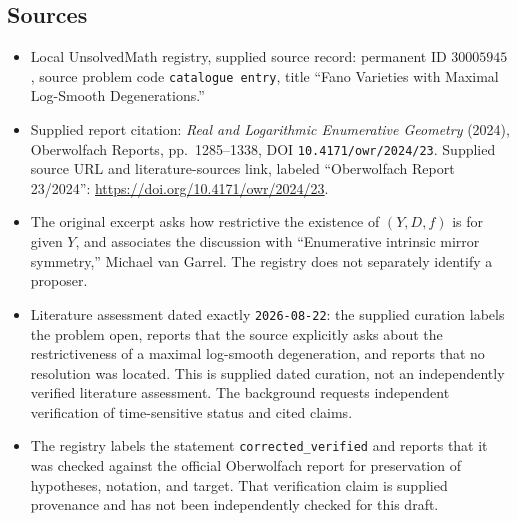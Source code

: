 \documentclass[11pt]{article}
\begin{document}
\subsection{Sources}
\begin{itemize}
\item Local UnsolvedMath registry, supplied source record: permanent ID \(30005945\), source problem code \texttt{catalogue entry}, title ``Fano Varieties with Maximal Log-Smooth Degenerations.''
\item Supplied report citation: \emph{Real and Logarithmic Enumerative Geometry} (2024), Oberwolfach Reports, pp.~1285--1338, DOI \texttt{10.4171/owr/2024/23}. Supplied source URL and literature-sources link, labeled ``Oberwolfach Report 23/2024'': \url{https://doi.org/10.4171/owr/2024/23}.
\item The original excerpt asks how restrictive the existence of \((Y,D,f)\) is for given \(Y\), and associates the discussion with ``Enumerative intrinsic mirror symmetry,'' Michael van Garrel. The registry does not separately identify a proposer.
\item Literature assessment dated exactly \texttt{2026-08-22}: the supplied curation labels the problem open, reports that the source explicitly asks about the restrictiveness of a maximal log-smooth degeneration, and reports that no resolution was located. This is supplied dated curation, not an independently verified literature assessment. The background requests independent verification of time-sensitive status and cited claims.
\item The registry labels the statement \texttt{corrected\_verified} and reports that it was checked against the official Oberwolfach report for preservation of hypotheses, notation, and target. That verification claim is supplied provenance and has not been independently checked for this draft.
\end{itemize}
\end{document}
